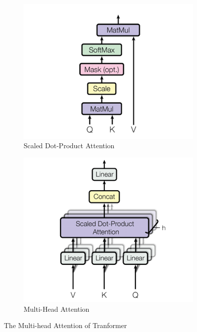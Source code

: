 \begin{figure}[h]
    \centering
    \begin{subfigure}[b]{0.45\textwidth}
        \centering
        \includegraphics[width=\textwidth]{../images/transformer-attention.png}
        \caption{Scaled Dot-Product Attention}
        \label{fig:transformer_attention1}
    \end{subfigure}
    \hfill
    \begin{subfigure}[b]{0.45\textwidth}
        \centering
        \includegraphics[width=\textwidth]{../images/transformer-multihead-attention.png}
        \caption{Multi-Head Attention}
        \label{fig:transformer_attention2}
    \end{subfigure}

    \caption{The Multi-head Attention of Tranformer}
	\label{fig:transformer_attention}
\end{figure}

